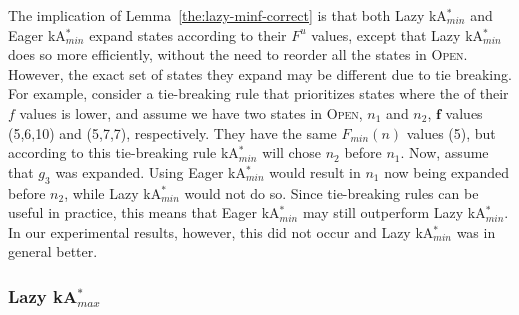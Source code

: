 \documentclass{aicom2e}
\newcommand{\kastarmin}{kA$^*_{min}$}
\newcommand{\kastarmax}{kA$^*_{max}$}
\newcommand{\minf}{$F_{min}(n)$}
\newcommand{\open}{\textsc{Open}}
\begin{document}
The implication of Lemma~\ref{the:lazy-minf-correct} is that 
both Lazy \kastarmin{} and Eager \kastarmin{} expand states according to their $F^u$ values, 
except that Lazy \kastarmin{} does so more efficiently, without the need to reorder all the states in \open{}. However, the exact set of states they expand may be different due to tie breaking. 
For example, consider a tie-breaking rule that prioritizes states 
where the of their $f$ values is lower, 
and assume we have two states in \open{}, $n_1$ and $n_2$, 
$\mathbf{f}$ values (5,6,10) and (5,7,7), respectively. 
They have the same \minf{} values (5), but according to this tie-breaking rule
\kastarmin{} will chose $n_2$ before $n_1$. Now, assume that $g_3$ was expanded. 
Using Eager \kastarmin{} would result in $n_1$ now being expanded before $n_2$, 
while Lazy \kastarmin{} would not do so. Since tie-breaking rules 
can be useful in practice, this means that Eager \kastarmin{} may still outperform Lazy \kastarmin{}. 
In our experimental results, however, this did not occur and Lazy \kastarmin{} was in general better. 


\subsubsection{Lazy \kastarmax{}}
\end{document}
